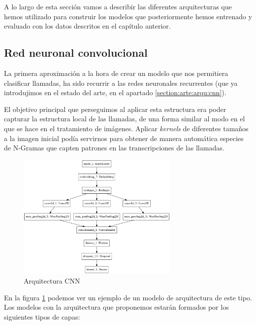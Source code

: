 A lo largo de esta sección vamos a describir las diferentes arquitecturas que hemos utilizado para construir los modelos que posteriormente hemos entrenado y evaluado con los datos descritos en el capítulo anterior. 

\subsection{Red neuronal convolucional}

La primera aproximación a la hora de crear un modelo que nos permitiera clasificar llamadas, ha sido recurrir a las redes neuronales recurrentes (que ya introdujimos en el estado del arte, en el apartado \ref{section:arte:arqu:cnn}). 

El objetivo principal que perseguimos al aplicar esta estructura era poder capturar la estructura local de las llamadas, de una forma similar al modo en el que se hace en el tratamiento de imágenes. Aplicar \textit{kernels} de diferentes tamaños a la imagen inicial podía servirnos para obtener de manera automática especies de N-Gramas  que capten patrones en las transcripciones de las llamadas. 

\begin{figure}[!ht]
	\centering
	\includegraphics[width=0.7\textwidth]{images/super/arq_cnn}
	\caption{Arquitectura CNN}
	\label{fig:arqcnn}
\end{figure}


En la figura \ref{fig:arqcnn} podemos ver un ejemplo de un modelo de arquitectura de este tipo. Los modelos con la arquitectura que proponemos estarán formados por los siguientes tipos de capas: 

